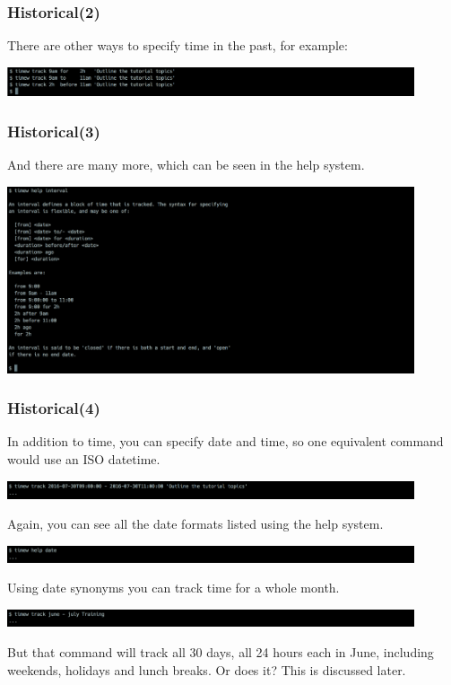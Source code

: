 \documentclass[t,handout]{beamer}
\begin{document}
\begin{frame}[fragile]\frametitle{Historical(2)}
    There are other ways to specify time in the past, for example:

    \includegraphics[width=12cm]{images/tutorial16.png}
\end{frame}

\begin{frame}[fragile]\frametitle{Historical(3)}
    And there are many more, which can be seen in the help system.

    \includegraphics[width=12cm]{images/tutorial17.png}
\end{frame}

\begin{frame}[fragile]\frametitle{Historical(4)}
    In addition to time, you can specify date and time, so one equivalent command would use an ISO datetime.

    \includegraphics[width=12cm]{images/tutorial18.png}

    Again, you can see all the date formats listed using the help system.

    \includegraphics[width=12cm]{images/tutorial19.png}

    Using date synonyms you can track time for a whole month.

    \includegraphics[width=12cm]{images/tutorial20.png}

    But that command will track all 30 days, all 24 hours each in June, including weekends, holidays and lunch breaks. Or does it? This is discussed later.
\end{frame}
\end{document}
